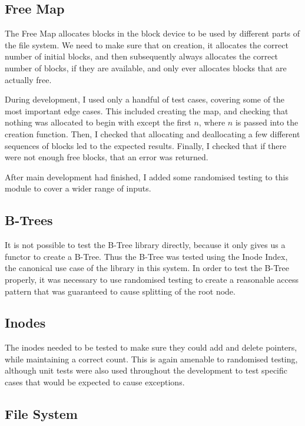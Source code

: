 \documentclass[12pt,a4paper,twoside,openright]{report}
\begin{document}
\subsection{Free Map}

The Free Map allocates blocks in the block device to be used by different parts of the file system. We need to make sure that on creation, it allocates the correct number of initial blocks, and then subsequently always allocates the correct number of blocks, if they are available, and only ever allocates blocks that are actually free.

During development, I used only a handful of test cases, covering some of the most important edge cases. This included creating the map, and checking that nothing was allocated to begin with except the first $n$, where $n$ is passed into the creation function. Then, I checked that allocating and deallocating a few different sequences of blocks led to the expected results. Finally, I checked that if there were not enough free blocks, that an error was returned.

After main development had finished, I added some randomised testing to this module to cover a wider range of inputs.

\subsection{B-Trees}

It is not possible to test the B-Tree library directly, because it only gives us a functor to create a B-Tree. Thus the B-Tree was tested using the Inode Index, the canonical use case of the library in this system. In order to test the B-Tree properly, it was necessary to use randomised testing to create a reasonable access pattern that was guaranteed to cause splitting of the root node.

\subsection{Inodes}

The inodes needed to be tested to make sure they could add and delete pointers, while maintaining a correct count. This is again amenable to randomised testing, although unit tests were also used throughout the development to test specific cases that would be expected to cause exceptions.

\subsection{File System}
\end{document}
